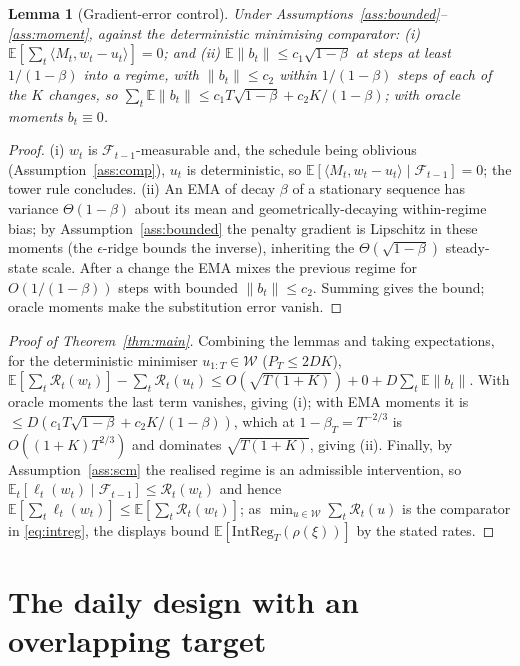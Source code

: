 \documentclass[12pt]{article}
\theoremstyle{plain}
\newtheorem{lemma}{Lemma}
\theoremstyle{remark}
\newcommand{\E}{\mathbb{E}}
\begin{document}
\begin{lemma}[Gradient-error control]\label{lem:mom}
Under Assumptions~\ref{ass:bounded}--\ref{ass:moment}, against the deterministic
minimising comparator: (i) $\E[\sum_t\langle M_t,w_t-u_t\rangle]=0$; and (ii)
$\E\|b_t\|\le c_1\sqrt{1-\beta}$ at steps at least $1/(1-\beta)$ into a regime, with
$\|b_t\|\le c_2$ within $1/(1-\beta)$ steps of each of the $K$ changes, so
$\sum_t\E\|b_t\|\le c_1 T\sqrt{1-\beta}+c_2 K/(1-\beta)$; with oracle moments $b_t\equiv0$.
\end{lemma}
\begin{proof}
(i) $w_t$ is $\mathcal F_{t-1}$-measurable and, the schedule being oblivious
(Assumption~\ref{ass:comp}), $u_t$ is deterministic, so
$\E[\langle M_t,w_t-u_t\rangle\mid\mathcal F_{t-1}]=0$; the tower rule concludes. (ii) An
EMA of decay $\beta$ of a stationary sequence has variance $\Theta(1-\beta)$ about its
mean and geometrically-decaying within-regime bias; by Assumption~\ref{ass:bounded} the
penalty gradient is Lipschitz in these moments (the $\epsilon$-ridge bounds the
inverse), inheriting the $\Theta(\sqrt{1-\beta})$ steady-state scale. After a change the
EMA mixes the previous regime for $O(1/(1-\beta))$ steps with bounded $\|b_t\|\le c_2$.
Summing gives the bound; oracle moments make the substitution error vanish.
\end{proof}

\begin{proof}[Proof of Theorem~\ref{thm:main}]
Combining the lemmas and taking expectations, for the deterministic minimiser
$u_{1:T}\in\mathcal{W}$ ($P_T\le 2DK$),
$\E[\sum_t\mathcal{R}_t(w_t)]-\sum_t\mathcal{R}_t(u_t)\le O(\sqrt{T(1+K)})+0+D\sum_t\E\|b_t\|$.
With oracle moments the last term vanishes, giving (i); with EMA moments it is
$\le D(c_1T\sqrt{1-\beta}+c_2K/(1-\beta))$, which at $1-\beta_T=T^{-2/3}$ is
$O((1+K)T^{2/3})$ and dominates $\sqrt{T(1+K)}$, giving (ii). Finally, by
Assumption~\ref{ass:scm} the realised regime is an admissible intervention, so
$\E_t[\ell_t(w_t)\mid\mathcal F_{t-1}]\le\mathcal{R}_t(w_t)$ and hence
$\E[\sum_t\ell_t(w_t)]\le\E[\sum_t\mathcal{R}_t(w_t)]$; as
$\min_{u\in\mathcal{W}}\sum_t\mathcal{R}_t(u)$ is the comparator in \eqref{eq:intreg}, the
displays bound $\E[\mathrm{IntReg}_T(\rho(\xi))]$ by the stated rates.
\end{proof}

\section{The daily design with an overlapping target}\label{app:daily}
\end{document}
